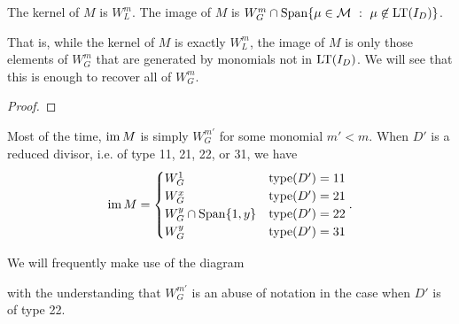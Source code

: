 \begin{proposition}
  \label{prop_ker_im_M}
  The kernel of $M$ is $W_L^m$.
  The image of $M$ is $W_G^m \cap \operatorname{Span} \{ \mu \in \mathcal{M} ~:~ \mu \not \in \operatorname{LT}(I_D) \}$.
\end{proposition}
That is, while the kernel of $M$ is exactly $W_L^m$,
the image of $M$ is only those elements of $W_G^m$ that are generated by monomials not in $\operatorname{LT}(I_D)$.
We will see that this is enough to recover all of $W_G^m$.
\begin{proof}
\end{proof}

Most of the time, $\operatorname{im} M$ is simply $W_G^{m'}$ for some monomial $m' < m$.
When $D'$ is a reduced divisor, i.e. of type 11, 21, 22, or 31, we have
\[
  \operatorname{im} M = \begin{cases}
    W_G^1 & \operatorname{type}(D') = 11 \\
    W_G^x & \operatorname{type}(D') = 21 \\
    W_G^y \cap \operatorname{Span}\{ 1, y \} & \operatorname{type}(D') = 22 \\
    W_G^y & \operatorname{type}(D') = 31
  \end{cases}.
\]

We will frequently make use of the diagram
\begin{center}
\end{center}
with the understanding that $W_G^{m'}$ is an abuse of notation in the case when $D'$ is of type 22.

